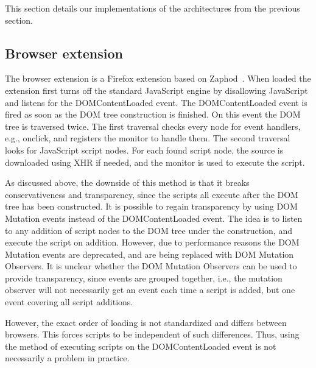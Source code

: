 \documentclass{llncs}
\newcommand{\todo}[1]{\colorbox{red}{\textcolor{white}{\sffamily\bfseries\scriptsize TODO}} \textcolor{red}{#1} \textcolor{red}{$\blacktriangleleft$}}
\begin{document}
This section details our implementations of the architectures
from the previous section. 


\subsection{Browser extension}

The browser extension is a Firefox extension based on Zaphod~\cite{Zaphod}.
When loaded the extension first turns off the standard JavaScript engine by
disallowing JavaScript and listens for the DOMContentLoaded event.  The
DOMContentLoaded event is fired as soon as the DOM tree construction is
finished.  On this event the DOM tree is traversed twice. The first traversal
checks every node for event handlers, e.g., onclick, and registers the monitor
to handle them. The second traversal looks for JavaScript script nodes.  For
each found script node, the source is downloaded using XHR if needed, and the
monitor is used to execute the script.

As discussed above, the downside of this method is that it breaks
conservativeness and transparency, since the scripts all execute after the DOM
tree has been constructed. It is possible to regain transparency by using DOM
Mutation events instead of the DOMContentLoaded event.  The idea is to listen
to any addition of script nodes to the DOM tree under the construction, and
execute the script on addition.  However, due to performance reasons the DOM
Mutation events are deprecated, and are being replaced with DOM Mutation
Observers. It is unclear whether the DOM Mutation Observers can be used to
provide transparency, since events are grouped together, i.e., the mutation
observer will not necessarily get an event each time a script is added, but one
event covering all script additions.

However, the exact order of loading is not standardized and differs between
browsers. This forces scripts to be independent of such differences. Thus,
using the method of executing scripts on the DOMContentLoaded event is not
necessarily a problem in practice. 
\end{document}
